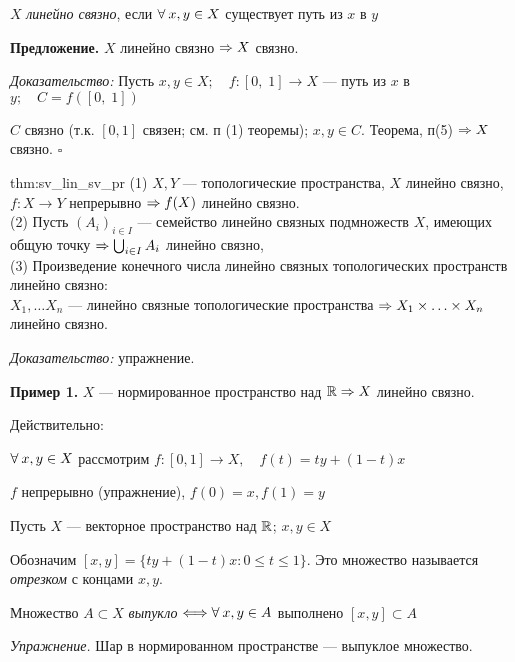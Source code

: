\documentclass[../../main.tex]{subfiles}
\begin{document}
 $X$ \textit{линейно связно}, если $\forall\: x, y \in X$ существует путь из $x$ в $y$

\textbf{Предложение.} $X$ линейно связно $\Rightarrow X$ связно. 

\textit{Доказательство:} Пусть $x, y \in X; \quad f \colon [0,\;1] \to X$ — путь из $x$ в $y; \quad C = f\left([0,\;1] \right)$ 

$C$ связно (т.к. $[0,1]$ связен; см. п (1) теоремы); $x,y \in C.$ Теорема, п(5) $\Rightarrow X$ связно. $\square$

\begin{theo}{thm:sv_lin_sv_pr}
(1) $X, Y$ — топологические пространства, $X$  линейно связно, $f \colon X \to Y$  непрерывно $\Rightarrow f(X)$ линейно связно.\\
(2) Пусть $(A_i)_{i \in I}$ — семейство линейно связных подмножеств $X$, имеющих общую точку $\Rightarrow \bigcup_{i \in I} A_i$ линейно связно,\\
(3) Произведение конечного числа линейно связных топологических пространств линейно связно:\\ $X_1, \ldots X_n$ — линейно связные топологические пространства $\Rightarrow X_1 \times \ldots \times X_n$ линейно связно.
\end{theo}


\begin{minipage}{0.7\linewidth}

\textit{Доказательство:} упражнение.

\textbf{Пример 1.} $X$ — нормированное пространство над $\mathbb{R} \Rightarrow X$ линейно связно. 

Действительно:

$\forall\: x, y \in X$ рассмотрим $f \colon [0,1] \to X, \quad f(t) = ty + (1 - t)x$

$f$ непрерывно (упражнение), $f(0) = x, f(1) = y$

 Пусть $X$ — векторное пространство над $\mathbb{R}$; $x, y \in X$

Обозначим $[x,y] = \lbrace ty + (1 - t)x \colon 0 \leq t \leq 1 \rbrace$. Это множество называется \textit{отрезком} с концами $x, y$.

Множество $A \subset X$ \textit{выпукло} $\Longleftrightarrow \forall\: x, y \in A$ выполнено $[x, y] \subset A$

\textit{Упражнение.} Шар в нормированном пространстве — выпуклое множество.

\end{minipage}
\begin{minipage}{0.3\linewidth}

\end{minipage}
\end{document}

